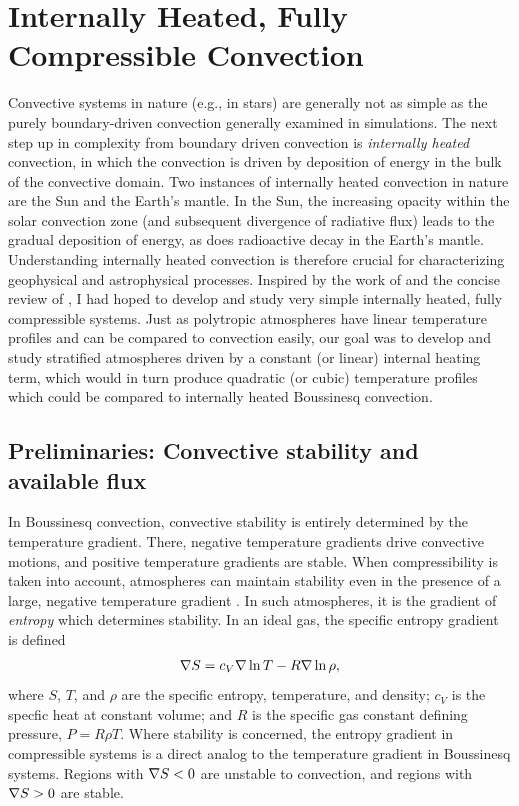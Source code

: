 \section{Internally Heated, Fully Compressible Convection}
\label{sec:internally_heated}
Convective systems in nature (e.g., in stars) are generally not as simple as the purely boundary-driven convection generally examined in simulations.
The next step up in complexity from boundary driven convection is \emph{internally heated} convection, in which the convection is driven by deposition of energy in the bulk of the convective domain.
Two instances of internally heated convection in nature are the Sun and the Earth's mantle.
In the Sun, the increasing opacity within the solar convection zone (and subsequent divergence of radiative flux) leads to the gradual deposition of energy, as does radioactive decay in the Earth's mantle.
Understanding internally heated convection is therefore crucial for characterizing geophysical and astrophysical processes.
Inspired by the work of \citet{goluskin&spiegel2012} and the concise review of \citet{goluskin2016}, I had hoped to develop and study very simple internally heated, fully compressible systems.
Just as polytropic atmospheres have linear temperature profiles and can be compared to \RB convection easily, our goal was to develop and study stratified atmospheres driven by a constant (or linear) internal heating term, which would in turn produce quadratic (or cubic) temperature profiles which could be compared to internally heated Boussinesq convection.

\subsection{Preliminaries: Convective stability and available flux}
\label{sec:stability}
In Boussinesq convection, convective stability is entirely determined by the temperature gradient.
There, negative temperature gradients drive convective motions, and positive temperature gradients are stable.
When compressibility is taken into account, atmospheres can maintain stability even in the presence of a large, negative temperature gradient \citep{spiegel&veronis1960}.
In such atmospheres, it is the gradient of \emph{entropy} which determines stability.
In an ideal gas, the specific entropy gradient is defined
\begin{equation}
\nabla S = c_V \nabla\ln T - R \nabla\ln\rho,
\end{equation}
where $S$, $T$, and $\rho$ are the specific entropy, temperature, and density; $c_V$ is the specfic heat at constant volume; and $R$ is the specific gas constant defining pressure, $P = R \rho T$.
Where stability is concerned, the entropy gradient in compressible systems is a direct analog to the temperature gradient in Boussinesq systems.
Regions with $\nabla S < 0$ are unstable to convection, and regions with $\nabla S > 0$ are stable.

